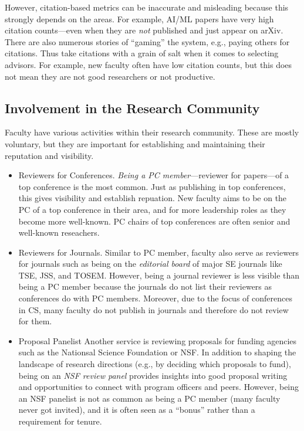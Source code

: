 \documentclass[oneside,11pt]{book}
\begin{document}
However, citation-based metrics can be inaccurate and misleading because this strongly depends on the areas.  For example, AI/ML papers have very high citation counts---even when they are \emph{not} published and just appear on arXiv.  There are also numerous stories of ``gaming'' the system, e.g., paying others for citations.
Thus take citations with a grain of salt when it comes to selecting advisors. For example, new faculty often have low citation counts, but this does not mean they are not good researchers or not productive.


\subsection{Involvement in the Research Community}

Faculty have various activities within their research community.
These are mostly voluntary, but they are important for establishing and maintaining their reputation and visibility.

\begin{itemize}
\item Reviewers for Conferences. \emph{Being a PC member}---reviewer for papers---of a top conference is the most common. Just as publishing in top conferences, this gives visibility and establish repuation.
New faculty aims to be on the PC of a top conference in their area, and  for more leadership roles as they become more well-known. PC chairs of top conferences are often senior and well-known reseachers.

\item Reviewers for Journals. Similar to PC member, faculty also serve as reviewers for journals such as being on the \emph{editorial board} of major SE journals like TSE, JSS, and TOSEM. 
However, being a journal reviewer is less visible than being a PC member because the journals do not list their reviewers as conferences do with PC members. Moreover, due to the focus of conferences in CS, many faculty do not publish in journals and therefore do not review for them.


\item {Proposal Panelist} Another service
is reviewing proposals for funding agencies such as the Nationsal Science Foundation or NSF. In addition to shaping the landscape of research directions (e.g., by deciding which proposals to fund), being on an \emph{NSF review panel} provides insights into good proposal writing and opportunities to connect with program officers and peers. However, being an NSF panelist is not as common as being a PC member (many faculty never got invited), and it is often seen as a ``bonus'' rather than a requirement for tenure. 
\end{itemize}
\end{document}
